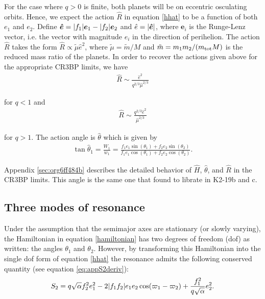 \documentclass[usenatbib,twocolumn]{mnras}
\renewcommand{\v}[1]{\boldsymbol{ #1 }}
\DeclarePairedDelimiter{\abs}{|}{|}
\begin{document}
For the case where \(q>0\) is finite, both planets will be on eccentric
osculating orbits.  Hence, we expect the action \(\hat R\) in equation
\eqref{hhat} to be a function of both \(e_1\) and \(e_2\).  Define \(\v{\hat
e} = \abs{f_1}\v e_1 - \abs{f_2}\v e_2\) and \(\hat e = \abs{\v{\hat
e}}\), where \(\v e_i\) is the Runge-Lenz vector, i.e. the vector with
magnitude \(e_i\) in the direction of perihelion.  The action \(\hat R\)
takes the form \(\hat R \propto \tilde \mu \hat e^2\), where
\(\tilde\mu=\tilde m/M\) and \(\tilde m= m_1m_2/(m_{\rm tot}M)\) is
the reduced mass ratio of the planets. In order to recover the actions
given above for the appropriate CR3BP limits, we have
\begin{align}
\label{eq:R1hatlimit}
  \hat R \sim\frac{\hat e^2}{q^{2/3}\hat\mu^{2/3}}
\end{align}

\noindent for \(q < 1\) and
\begin{align}
\label{eq:R2hatlimit}
  \hat R \sim\frac{q^{2/3}\hat e^2}{\hat\mu^{2/3}}
\end{align}

\noindent for \(q>1\).  The action angle is \(\hat\theta\) which
is given by
\begin{align}
\label{hattheta}
  \tan\hat{\theta}_1 = \frac{W_1}{w_1} = \frac{f_1 e_1\sin(\theta_1)
  + f_2e_2\sin(\theta_2)}{f_1e_1\cos(\theta_1) + f_2e_2\cos(\theta_2)}.
\end{align}

\noindent
Appendix \ref{sec:org6ff484b}
describes the detailed behavior of \(\hat H\), \(\hat \theta\),
and \(\hat R\) in the CR3BP limits.
This angle is the same one that \citet{petit_resonance_2020}
found to librate in K2-19b and c.

\subsection{Three modes of resonance}
\label{sec:orgab9d4bc}
Under the assumption that the semimajor axes are stationary (or slowly
varying), the Hamiltonian in equation \eqref{hamiltonian} has two
degrees of freedom (dof) as written: the angles \(\theta_1\) and
\(\theta_2\).  However, by transforming this Hamiltonian into the single
dof form of equation \eqref{hhat} the resonance admits the following
conserved quantity (see equation \eqref{eq:appS2deriv}):
\begin{align}
  \label{eq:s2}
  S_2 = q\sqrt{\alpha}f_2^2e_1^2
-2\abs{f_1f_2}e_1e_2\cos(\varpi_1-\varpi_2) + \frac{f_1^2}{q\sqrt\alpha}e_2^2.
\end{align}
\end{document}
